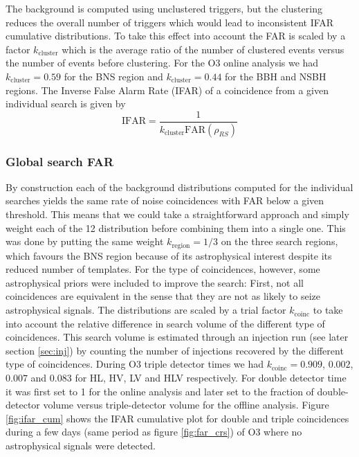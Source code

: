 The background is computed using unclustered triggers, but the clustering reduces the overall number of triggers which would lead to inconsistent IFAR cumulative distributions.
To take this effect into account the FAR is scaled by a factor $k_{\textrm{cluster}}$ which is the average ratio of the number of clustered events versus the number of events before clustering.
For the O3 online analysis we had $k_{\textrm{cluster}} = 0.59$ for the BNS region and $k_{\textrm{cluster}} = 0.44$ for the BBH and NSBH regions.
The Inverse False Alarm Rate (IFAR) of a coincidence from a given individual search is given by
%
\begin{equation}
  \textrm{IFAR} = \frac{1}{k_{\textrm{cluster}} \textrm{FAR}(\rho_{RS})}
\end{equation}
%


\subsubsection{Global search FAR}
By construction each of the background distributions computed for the individual searches yields the same rate of noise coincidences with FAR below a given threshold.
This means that we could take a straightforward approach and simply weight each of the 12 distribution before combining them into a single one.
This was done by putting the same weight $k_{\textrm{region}} = 1/3$ on the three search regions, which favours the BNS region because of its astrophysical interest despite its reduced number of templates.
For the type of coincidences, however, some astrophysical priors were included to improve the search:
First, not all coincidences are equivalent in the sense that they are not as likely to seize astrophysical signals.
The distributions are scaled by a trial factor $k_{\textrm{coinc}}$ to take into account the relative difference in search volume of the different type of coincidences.
This search volume is estimated through an injection run (see later section \ref{sec:inj}) by counting the number of injections recovered by the different type of coincidences.
During O3 triple detector times we had $k_{\textrm{coinc}} = 0.909$, $0.002$, $0.007$ and $0.083$ for HL, HV, LV and HLV respectively.
For double detector time it was first set to 1 for the online analysis and later set to the fraction of double-detector volume versus triple-detector volume for the offline analysis.
Figure \ref{fig:ifar_cum} shows the IFAR cumulative plot for double and triple coincidences during a few days (same period as figure \ref{fig:far_crs}) of O3 where no astrophysical signals were detected.


